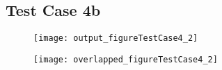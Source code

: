 \subsection{Test Case 4b}
\begin{figure}
  \centering
  \texttt{[image: output\_figureTestCase4\_2]}
  \caption{}\label{figure_testcase4_2}
\end{figure}

\begin{figure}
  \centering
  \texttt{[image: overlapped\_figureTestCase4\_2]}
  \caption{}\label{figure_testcase4_2_overlapped}
\end{figure}
